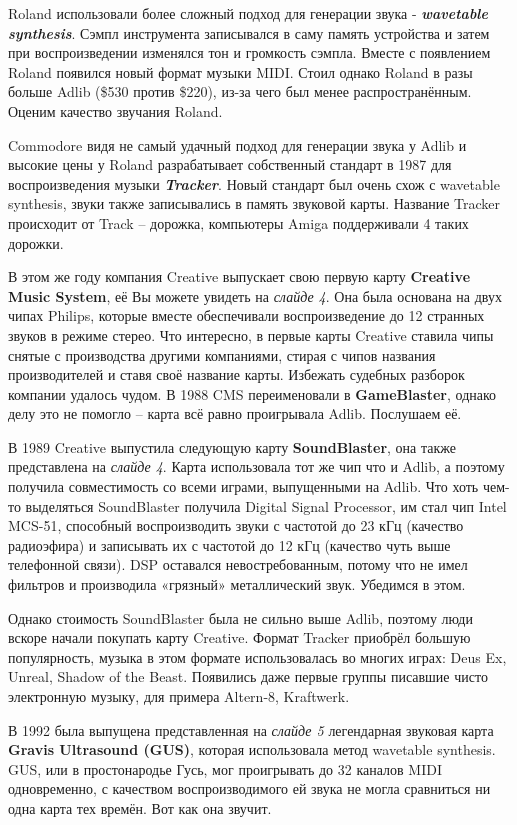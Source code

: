 \documentclass[a4paper,12pt]{extarticle}
\begin{document}
    Roland использовали более сложный подход для генерации звука - \textbf{\textit{wavetable synthesis}}. Сэмпл инструмента записывался в саму память устройства и затем при воспроизведении изменялся тон и громкость сэмпла. Вместе с появлением Roland появился новый формат музыки MIDI. Стоил однако Roland в разы больше Adlib (\$530 против \$220), из-за чего был менее распространённым. Оценим качество звучания Roland.

    Commodore видя не самый удачный подход для генерации звука у Adlib и высокие цены у Roland разрабатывает собственный стандарт в 1987 для воспроизведения музыки \textbf{\textit{Tracker}}. Новый стандарт был очень схож с wavetable synthesis, звуки также записывались в память звуковой карты. Название Tracker происходит от Track – дорожка, компьютеры Amiga поддерживали 4 таких дорожки.

    В этом же году компания Creative выпускает свою первую карту \textbf{Creative Music System}, её Вы можете увидеть на \textit{слайде 4}. Она была основана на двух чипах Philips, которые вместе обеспечивали воспроизведение до 12 странных звуков в режиме стерео. Что интересно, в первые карты Creative ставила чипы снятые с производства другими компаниями, стирая с чипов названия производителей и ставя своё название карты. Избежать судебных разборок компании удалось чудом. В 1988 CMS переименовали в \textbf{GameBlaster}, однако делу это не помогло – карта всё равно проигрывала Adlib. Послушаем её.

    В 1989 Creative выпустила следующую карту \textbf{SoundBlaster}, она также представлена на \textit{слайде 4}. Карта использовала тот же чип что и Adlib, а поэтому получила совместимость со всеми играми, выпущенными на Adlib. Что хоть чем-то выделяться SoundBlaster получила Digital Signal Processor, им стал чип Intel MCS-51, способный воспроизводить звуки с частотой до 23 кГц (качество радиоэфира) и записывать их с частотой до 12 кГц (качество чуть выше телефонной связи). DSP оставался невостребованным, потому что не имел фильтров и производила «грязный» металлический звук. Убедимся в этом.

    Однако стоимость SoundBlaster была не сильно выше Adlib, поэтому люди вскоре начали покупать карту Creative.
    Формат Tracker приобрёл большую популярность, музыка в этом формате использовалась во многих играх: Deus Ex, Unreal, Shadow of the Beast. Появились даже первые группы писавшие чисто электронную музыку, для примера Altern-8, Kraftwerk.

    В 1992 была выпущена представленная на \textit{слайде 5} легендарная звуковая карта \textbf{Gravis Ultrasound (GUS)}, которая использовала метод wavetable synthesis. GUS, или в простонародье Гусь, мог проигрывать до 32 каналов MIDI одновременно, с качеством воспроизводимого ей звука не могла сравниться ни одна карта тех времён. Вот как она звучит.
\end{document}
